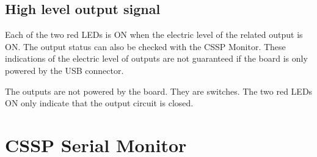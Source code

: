 \section{High level output signal}

Each of the two red LEDs is ON when the electric level of the related output is ON. The output status can also be checked with the CSSP Monitor.
These indications of the electric level of outputs are not guaranteed if the board is only powered by the USB connector.

The outputs are not powered by the board. They are switches. The two red LEDs ON only indicate that the output circuit is closed.

\chapter{CSSP Serial Monitor}
\label{CSSP Serial Monitor}

